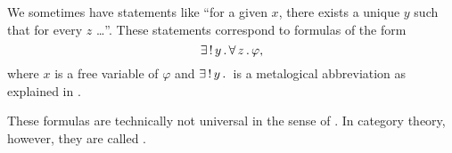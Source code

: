 \begin{remark}\label{rem:universal_property}
  We sometimes have statements like \enquote{for a given \( x \), there exists a unique \( y \) such that for every \( z \) \ldots}. These statements correspond to formulas of the form
  \begin{equation*}
    \exists \thinspace ! \thinspace y \thinspace . \thinspace \forall \thinspace z \thinspace . \thinspace \varphi,
  \end{equation*}
  where \( x \) is a free variable of \( \varphi \) and \( \exists \thinspace ! \thinspace y \thinspace . \thinspace \) is a metalogical abbreviation as explained in .

  These formulas are technically not universal in the sense of . In category theory, however, they are called .
\end{remark}
